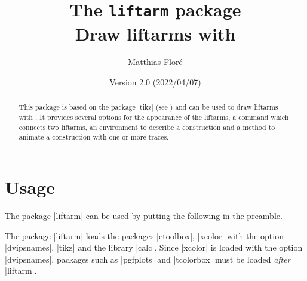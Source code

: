 \documentclass[a4paper,english,dvipsnames]{ltxdoc}
\title{The \texttt{liftarm} package\\[12pt]\large Draw liftarms with \tikzname}
\author{Matthias Flor\'e}
\date{Version 2.0 (2022/04/07)}%
\begin{document}
\maketitle
\thispagestyle{fancy}
\begin{abstract}
\noindent This package is based on the package |tikz| (see \cite{TtTaPGFp}) and can be used to draw liftarms with \tikzname. It provides several options for the appearance of the liftarms, a command which connects two liftarms, an environment to describe a construction and a method to animate a construction with one or more traces.%
\end{abstract}
\tableofcontents
\section{Usage}
The package |liftarm| can be used by putting the following in the preamble.
\begin{codeexample}
\usepackage{liftarm}
\end{codeexample}
The package |liftarm| loads the packages |etoolbox|, |xcolor| with the option |dvipsnames|, |tikz| and the \tikzname{} library |calc|. Since |xcolor| is loaded with the option |dvipsnames|, packages such as |pgfplots| and |tcolorbox| must be loaded \emph{after} |liftarm|.
\end{document}
